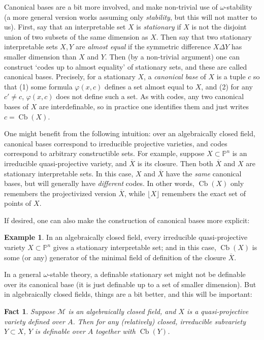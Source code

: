 \documentclass{amsart}
\newtheorem{fact}[theorem]{Fact}
\theoremstyle{definition}
\newtheorem{example}[theorem]{Example}
\begin{document}
Canonical bases are a bit more involved, and make non-trivial use of $\omega$-stability (a more general version works assuming only \textit{stability}, but this will not matter to us). First, say that an interpretable set $X$ is \textit{stationary} if $X$ is not the disjoint union of two subsets of the same dimension as $X$. Then say that two stationary interpretable sets $X,Y$ are \textit{almost equal} if the symmetric difference $X\Delta Y$ has smaller dimension than $X$ and $Y$. Then (by a non-trivial argument) one can construct `codes up to almost equality' of stationary sets, and these are called canonical bases. Precisely, for a stationary $X$, a \textit{canonical base} of $X$ is a tuple $c$ so that (1) some formula $\varphi(x,c)$ defines a set almost equal to $X$, and (2) for any $c'\neq c$, $\varphi(x,c)$ does not define such a set. As with codes, any two canonical bases of $X$ are interdefinable, so in practice one identifies them and just writes $c=\operatorname{Cb}(X)$.

One might benefit from the following intuition: over an algebraically closed field, canonical bases correspond to irreducible projective varieties, and codes correspond to arbitrary constructible sets. For example, suppose $X\subset\mathbb P^n$ is an irreducible quasi-projective variety, and $\overline X$ is its closure. Then both $\overline X$ and $X$ are stationary interpretable sets. In this case, $X$ and $\overline X$ have the \textit{same} canonical bases, but will generally have \textit{different} codes. In other words, $\operatorname{Cb}(X)$ only remembers the projectivized version $\overline X$, while $\lfloor X\rfloor$ remembers the exact set of points of $X$.

If desired, one can also make the construction of canonical bases more explicit:  
\begin{example}
    In an algebraically closed field, every irreducible quasi-projective variety $X\subset\mathbb P^n$ gives a stationary interpretable set; and in this case, $\operatorname{Cb}(X)$ is some (or any) generator of the minimal field of definition of the closure $\overline X$.
\end{example}

In a general $\omega$-stable theory, a definable stationary set might not be definable over its canonical base (it is just definable up to a set of smaller dimension). But in algebraically closed fields, things are a bit better, and this will be important:

\begin{fact}\label{F: def over cb}
    Suppose $\mathcal M$ is an algebraically closed field, and $X$ is a quasi-projective variety defined over $A$. Then for any (relatively) closed, irreducible subvariety $Y\subset X$, $Y$ is definable over $A$ together with $\operatorname{Cb}(Y)$.
\end{fact}
\end{document}
